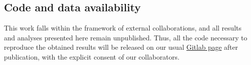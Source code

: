 \subsection{Code and data availability}
\label{Navigation_Code}

This work falls within the framework of external collaborations, and all results and analyses presented here remain unpublished. Thus, all the code necessary to reproduce the obtained results will be released on our usual \href{https://gitlabsbnb.irbbarcelona.org/packages}{Gitlab page} after publication, with the explicit consent of our collaborators.

